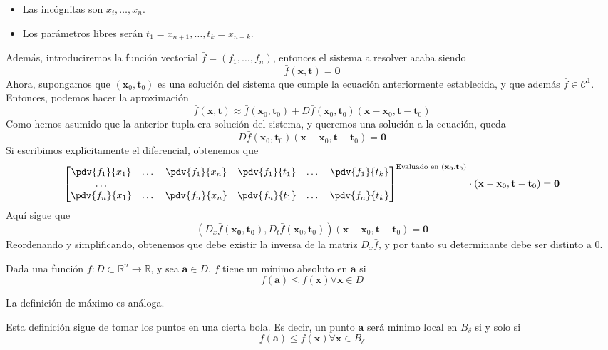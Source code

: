 \documentclass{../Calculo.tex}
\begin{document}
\begin{itemize}
	\item Las incógnitas son $x_{i},\dots ,x_{n}$.
	\item Los parámetros libres serán $t_1=x_{n+1},\dots ,t_{k}=x_{n+k}$. 
\end{itemize}
Además, introduciremos la función vectorial $\bar{f}=(f_1,\dots ,f_{n})$, entonces el sistema a resolver acaba siendo
\[
	\bar{f}(\mathbf{x}, \mathbf{t})=\mathbf{0}
\]
Ahora, supongamos que $(\mathbf{x}_{0}, \mathbf{t}_{0})$ es una solución del sistema que cumple la ecuación anteriormente establecida, y que además $\bar{f} \in \mathcal{C}^{1}$. Entonces, podemos hacer la aproximación
\[
	\bar{f}(\mathbf{x}, \mathbf{t}) \approx \bar{f}(\mathbf{x}_{0}, \mathbf{t}_{0})+D \bar{f}(\mathbf{x}_{0}, \mathbf{t}_{0})(\mathbf{x}-\mathbf{x}_{0}, \mathbf{t}-\mathbf{t}_{0})
\]
Como hemos asumido que la anterior tupla era solución del sistema, y queremos una solución a la ecuación, queda
\[
	D \bar{f}(\mathbf{x}_{0}, \mathbf{t}_{0})(\mathbf{x}-\mathbf{x}_{0},\mathbf{t}-\mathbf{t}_{0})=\mathbf{0}
\]
Si escribimos explícitamente el diferencial, obtenemos que
\[
	\begin{bmatrix}
	
		\pdv{f_1}{x_1}&\dots &\pdv{f_1}{x_{n}} & \pdv{f_1}{t_1}&\dots &\pdv{f_1}{t_{k}}\\
		\dots \\
		\pdv{f_{n}}{x_{1}}&\dots &\pdv{f_{n}}{x_{n}}&\pdv{f_{n}}{t_{1}}&\dots &\pdv{f_{n}}{t_{k}}
	
	\end{bmatrix}^{\text{Evaluado en }(\mathbf{x_{0}}, \mathbf{t}_{0})}\cdot (\mathbf{x}-\mathbf{x}_{0}, \mathbf{t}-\mathbf{t}_{0})= \mathbf{0}
\]
Aquí sigue que
\[
	\left(D_{x} \bar{f}(\mathbf{x_{0}}, \mathbf{t_0}),D_{t}\bar{f}(\mathbf{x}_{0}, \mathbf{t}_{0}) \right)(\mathbf{x}-\mathbf{x}_{0}, \mathbf{t}-\mathbf{t}_{0})=\mathbf{0}
\]
Reordenando y simplificando, obtenemos que debe existir la inversa de la matriz $D_{x} \bar{f}$, y por tanto su determinante debe ser distinto a $0$.
\begin{defin}
Dada una función $f:D \subset \mathbb{R}^{n} \to \mathbb{R}$, y sea $\mathbf{a} \in D$, $f$ tiene un mínimo absoluto en $\mathbf{a}$ si
\[
	f(\mathbf{a}) \leq f(\mathbf{x}) \forall \mathbf{x} \in D
\]
\end{defin}
La definición de máximo es análoga.
\begin{defin}
Esta definición sigue de tomar los puntos en una cierta bola. Es decir, un punto $\mathbf{a}$ será mínimo local en $B_{\delta}$ si y solo si
\[
	f(\mathbf{a}) \leq f(\mathbf{x}) \forall \mathbf{x} \in B_{\delta}
\]
\end{defin}
\end{document}

